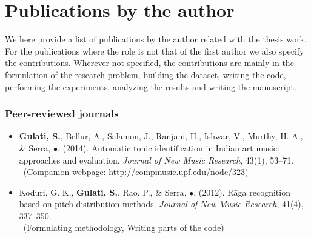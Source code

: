 \newcommand\contrib[1]{\\~{\footnotesize (#1)}}
% 
\newcommand\resource[2]{
	\noindent #1 \par
	\vspace{0.2em}
	{\centering	\url{#2} \par}
	\vspace{0.5em}
	\hrule \par 
	\vspace{0.8em} \par}
%
%
\chapter[Publications by the author][Publications by the author]{Publications by the author}\label{app:mypapers}%

We here provide a list of publications by the author related with the thesis work. For the publications where the role is not that of the first author we  also specify the contributions. Wherever not specified, the contributions are mainly in the formulation of the research problem, building the dataset, writing the code, performing the experiments, analyzing the results and writing the manuscript.

\subsection*{Peer-reviewed journals}
\begin{itemize}[leftmargin=*]
	\item \textbf{Gulati, S.}, Bellur, A., Salamon, J., Ranjani, H., Ishwar, V., Murthy, H. A., \& Serra, $\bullet$. (2014). Automatic tonic identification in Indian art music: approaches and evaluation. \textit{Journal of New Music Research}, 43(1), 53–71.
	\contrib{Companion webpage: \url{http://compmusic.upf.edu/node/323}}
	\item Koduri, G. K., \textbf{Gulati, S.}, Rao, P., \& Serra, $\bullet$. (2012). R\={a}ga recognition based on pitch distribution methods. \textit{Journal of New Music Research}, 41(4), 337–350.
	\contrib{Formulating methodology, Writing parts of the code}
	
\end{itemize}
%
